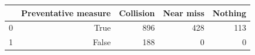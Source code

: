 \begin{tabular}{lrrrr}
\toprule
 & Preventative measure & Collision & Near miss & Nothing \\
\midrule
0 & True & 896 & 428 & 113 \\
1 & False & 188 & 0 & 0 \\
\bottomrule
\end{tabular}

